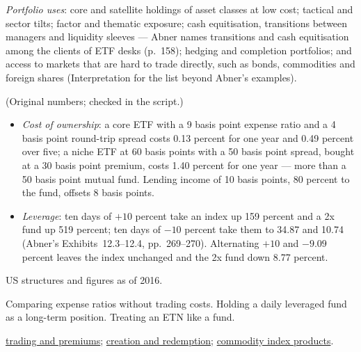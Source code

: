 \begin{qfmethod}
\emph{Portfolio uses}: core and satellite holdings of asset classes at low cost; tactical and sector tilts; factor and thematic exposure; cash equitisation, transitions between managers and liquidity sleeves --- Abner names transitions and cash equitisation among the clients of ETF desks (p.~158); hedging and completion portfolios; and access to markets that are hard to trade directly, such as bonds, commodities and foreign shares (Interpretation for the list beyond Abner's examples).

 (Original numbers; checked in the script.)
\begin{itemize}
\item \emph{Cost of ownership}: a core ETF with a 9 basis point expense ratio and a 4 basis point round-trip spread costs 0.13 percent for one year and 0.49 percent over five; a niche ETF at 60 basis points with a 50 basis point spread, bought at a 30 basis point premium, costs 1.40 percent for one year --- more than a 50 basis point mutual fund. Lending income of 10 basis points, 80 percent to the fund, offsets 8 basis points.
\item \emph{Leverage}: ten days of $+10$ percent take an index up 159 percent and a 2x fund up 519 percent; ten days of $-10$ percent take them to 34.87 and 10.74 (Abner's Exhibits~12.3--12.4, pp.~269--270). Alternating $+10$ and $-9.09$ percent leaves the index unchanged and the 2x fund down 8.77 percent.
\end{itemize}

 US structures and figures as of 2016.

 Comparing expense ratios without trading costs. Holding a daily leveraged fund as a long-term position. Treating an ETN like a fund.

 \hyperref[meth:etf-trading-tracking-premiums]{trading and premiums}; \hyperref[mech:etf-creation-redemption]{creation and redemption}; \hyperref[meth:commodity-swaps-index-construction]{commodity index products}.

\end{qfmethod}


